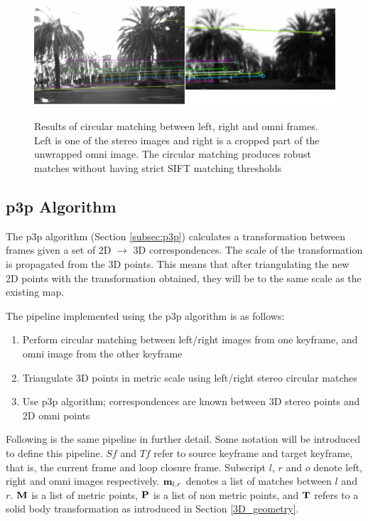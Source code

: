 \begin{figure}[h]
  \centering
    \includegraphics[width=1.0\textwidth]{chapters/images/circular_match}\\
  \caption{Results of circular matching between left, right and omni frames. Left is one of the stereo images and right is a cropped part of the unwrapped omni image. The circular matching produces robust matches without having strict SIFT matching thresholds}
  \label{fig:circular_match}
\end{figure}

\subsection{p3p Algorithm}
\label{p3p_algo}


The p3p algorithm (Section \ref{subsec:p3p}) calculates a transformation between frames given a set of 2D $\rightarrow$ 3D correspondences.  The scale of the transformation is propagated from the 3D points.  This means that after triangulating the new 2D points with the transformation obtained, they will be to the same scale as the existing map.

The pipeline implemented using the p3p algorithm is as follows:

\begin{enumerate}
\itemsep0em
 \item Perform circular matching between left/right images from one keyframe, and omni image from the other keyframe
 \item Triangulate 3D points in metric scale using left/right stereo circular matches
 \item Use p3p algorithm; correspondences are known between 3D stereo points and 2D omni points
\end{enumerate}

Following is the same pipeline in further detail.  Some notation will be introduced to define this pipeline.  $Sf$ and $Tf$ refer to source keyframe and target keyframe, that is, the current frame and loop closure frame.  Subscript $l$, $r$ and $o$ denote left, right and omni images respectively. $\mathbf {m}_{l,r}$ denotes a list of matches between $l$ and $r$.  $\mathbf M$ is a list of metric points, $\mathbf P$ is a list of non metric points, and $\mathbf T$ refers to a solid body transformation as introduced in Section \ref{3D_geometry}.

